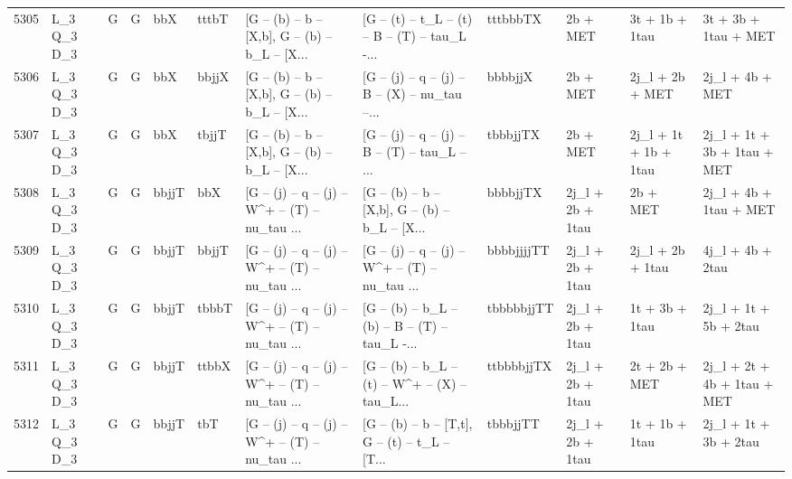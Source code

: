 \begin{tabular}{llllllllllll}
5305 &  L\_3 Q\_3 D\_3 &     G &     G &         bbX &       tttbT &  [G -- (b) -- b -- [X,b], G -- (b) -- b\_L -- [X... &  [G -- (t) -- t\_L -- (t) -- B -- (T) -- tau\_L -... &    tttbbbTX &                 2b + MET &           3t + 1b + 1tau &               3t + 3b + 1tau + MET \\
5306 &  L\_3 Q\_3 D\_3 &     G &     G &         bbX &       bbjjX &  [G -- (b) -- b -- [X,b], G -- (b) -- b\_L -- [X... &  [G -- (j) -- q -- (j) -- B -- (X) -- nu\_tau --... &     bbbbjjX &                 2b + MET &          2j\_l + 2b + MET &                    2j\_l + 4b + MET \\
5307 &  L\_3 Q\_3 D\_3 &     G &     G &         bbX &       tbjjT &  [G -- (b) -- b -- [X,b], G -- (b) -- b\_L -- [X... &  [G -- (j) -- q -- (j) -- B -- (T) -- tau\_L -- ... &    tbbbjjTX &                 2b + MET &    2j\_l + 1t + 1b + 1tau &        2j\_l + 1t + 3b + 1tau + MET \\
5308 &  L\_3 Q\_3 D\_3 &     G &     G &       bbjjT &         bbX &  [G -- (j) -- q -- (j) -- W\textasciicircum + -- (T) -- nu\_tau ... &  [G -- (b) -- b -- [X,b], G -- (b) -- b\_L -- [X... &    bbbbjjTX &         2j\_l + 2b + 1tau &                 2b + MET &             2j\_l + 4b + 1tau + MET \\
5309 &  L\_3 Q\_3 D\_3 &     G &     G &       bbjjT &       bbjjT &  [G -- (j) -- q -- (j) -- W\textasciicircum + -- (T) -- nu\_tau ... &  [G -- (j) -- q -- (j) -- W\textasciicircum + -- (T) -- nu\_tau ... &  bbbbjjjjTT &         2j\_l + 2b + 1tau &         2j\_l + 2b + 1tau &                   4j\_l + 4b + 2tau \\
5310 &  L\_3 Q\_3 D\_3 &     G &     G &       bbjjT &       tbbbT &  [G -- (j) -- q -- (j) -- W\textasciicircum + -- (T) -- nu\_tau ... &  [G -- (b) -- b\_L -- (b) -- B -- (T) -- tau\_L -... &  tbbbbbjjTT &         2j\_l + 2b + 1tau &           1t + 3b + 1tau &              2j\_l + 1t + 5b + 2tau \\
5311 &  L\_3 Q\_3 D\_3 &     G &     G &       bbjjT &       ttbbX &  [G -- (j) -- q -- (j) -- W\textasciicircum + -- (T) -- nu\_tau ... &  [G -- (b) -- b\_L -- (t) -- W\textasciicircum + -- (X) -- tau\_L... &  ttbbbbjjTX &         2j\_l + 2b + 1tau &            2t + 2b + MET &        2j\_l + 2t + 4b + 1tau + MET \\
5312 &  L\_3 Q\_3 D\_3 &     G &     G &       bbjjT &         tbT &  [G -- (j) -- q -- (j) -- W\textasciicircum + -- (T) -- nu\_tau ... &  [G -- (b) -- b -- [T,t], G -- (t) -- t\_L -- [T... &    tbbbjjTT &         2j\_l + 2b + 1tau &           1t + 1b + 1tau &              2j\_l + 1t + 3b + 2tau \\

\end{tabular}
